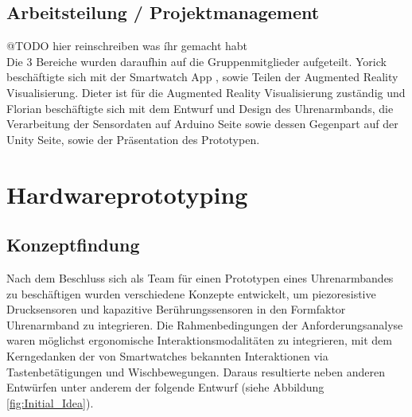 \documentclass[11pt, a4paper]{article}
\begin{document}
\subsection{Arbeitsteilung / Projektmanagement}

@TODO hier reinschreiben was íhr gemacht habt \\

Die 3 Bereiche wurden daraufhin auf die Gruppenmitglieder aufgeteilt. 
Yorick beschäftigte sich mit der Smartwatch App , sowie Teilen der Augmented Reality Visualisierung. 
Dieter ist für die Augmented Reality Visualisierung zuständig und Florian beschäftigte sich mit dem Entwurf und Design des Uhrenarmbands, die Verarbeitung der Sensordaten auf Arduino Seite sowie dessen Gegenpart auf der Unity Seite, sowie der Präsentation des Prototypen.


\newpage


\section{Hardwareprototyping}
\label{sec:Hardwareprototyping}

\subsection{Konzeptfindung}
\label{sec:hw_proc_concept}

Nach dem Beschluss sich als Team für einen Prototypen eines Uhrenarmbandes zu beschäftigen wurden verschiedene Konzepte entwickelt, um piezoresistive Drucksensoren und kapazitive Berührungssensoren in den Formfaktor Uhrenarmband zu integrieren. 
Die Rahmenbedingungen der Anforderungsanalyse waren möglichst ergonomische Interaktionsmodalitäten zu integrieren, mit dem Kerngedanken der von Smartwatches bekannten Interaktionen via Tastenbetätigungen und Wischbewegungen. 
Daraus resultierte neben anderen Entwürfen unter anderem der folgende Entwurf (siehe Abbildung \ref{fig:Initial_Idea}).
\end{document}
